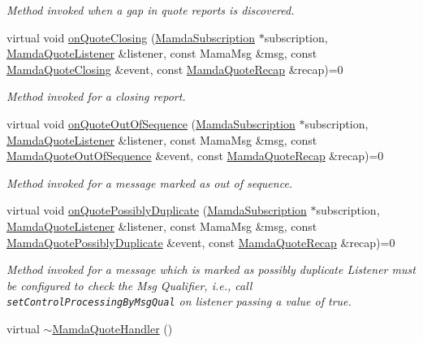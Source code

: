 \begin{CompactItemize}
\begin{CompactList}\small\item\em Method invoked when a gap in quote reports is discovered. \item\end{CompactList}\item 
virtual void \hyperlink{classWombat_1_1MamdaQuoteHandler_6f073c562e2a7c4c5acace68e1eadd83}{on\-Quote\-Closing} (\hyperlink{classWombat_1_1MamdaSubscription}{Mamda\-Subscription} $\ast$subscription, \hyperlink{classWombat_1_1MamdaQuoteListener}{Mamda\-Quote\-Listener} \&listener, const Mama\-Msg \&msg, const \hyperlink{classWombat_1_1MamdaQuoteClosing}{Mamda\-Quote\-Closing} \&event, const \hyperlink{classWombat_1_1MamdaQuoteRecap}{Mamda\-Quote\-Recap} \&recap)=0
\begin{CompactList}\small\item\em Method invoked for a closing report. \item\end{CompactList}\item 
virtual void \hyperlink{classWombat_1_1MamdaQuoteHandler_313ca96dc5f5e98fffb000895b1671b3}{on\-Quote\-Out\-Of\-Sequence} (\hyperlink{classWombat_1_1MamdaSubscription}{Mamda\-Subscription} $\ast$subscription, \hyperlink{classWombat_1_1MamdaQuoteListener}{Mamda\-Quote\-Listener} \&listener, const Mama\-Msg \&msg, const \hyperlink{classWombat_1_1MamdaQuoteOutOfSequence}{Mamda\-Quote\-Out\-Of\-Sequence} \&event, const \hyperlink{classWombat_1_1MamdaQuoteRecap}{Mamda\-Quote\-Recap} \&recap)=0
\begin{CompactList}\small\item\em Method invoked for a message marked as out of sequence. \item\end{CompactList}\item 
virtual void \hyperlink{classWombat_1_1MamdaQuoteHandler_3882274ea1964f319cf831ccd058c7f3}{on\-Quote\-Possibly\-Duplicate} (\hyperlink{classWombat_1_1MamdaSubscription}{Mamda\-Subscription} $\ast$subscription, \hyperlink{classWombat_1_1MamdaQuoteListener}{Mamda\-Quote\-Listener} \&listener, const Mama\-Msg \&msg, const \hyperlink{classWombat_1_1MamdaQuotePossiblyDuplicate}{Mamda\-Quote\-Possibly\-Duplicate} \&event, const \hyperlink{classWombat_1_1MamdaQuoteRecap}{Mamda\-Quote\-Recap} \&recap)=0
\begin{CompactList}\small\item\em Method invoked for a message which is marked as possibly duplicate Listener must be configured to check the Msg Qualifier, i.e., call {\tt set\-Control\-Processing\-By\-Msg\-Qual} on listener passing a value of true. \item\end{CompactList}\item 
virtual \hyperlink{classWombat_1_1MamdaQuoteHandler_552d394cad5214d6118e560f9007d0a1}{$\sim$Mamda\-Quote\-Handler} ()
\end{CompactItemize}


